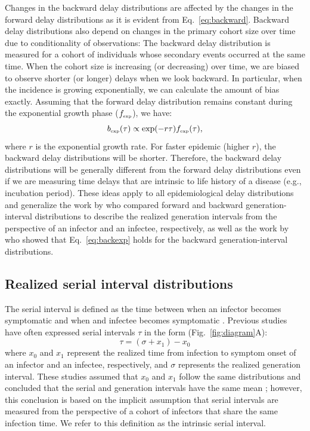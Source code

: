 \documentclass[12pt]{article}
\newcommand{\eref}[1]{Eq.~\ref{eq:#1}}
\newcommand{\fref}[1]{Fig.~\ref{fig:#1}}
\newcommand{\tsub}[2]{#1_{{\textrm{\tiny #2}}}}
\newcommand{\gtime}{\sigma} %
\begin{document}
Changes in the backward delay distributions are affected by the changes in the forward delay distributions as it is evident from \eref{backward}.
Backward delay distributions also depend on changes in the primary cohort size over time due to conditionality of observations: 
The backward delay distribution is measured for a cohort of individuals whose secondary events occurred at the same time.
When the cohort size is increasing (or decreasing) over time, we are biased to observe shorter (or longer) delays when we look backward.
In particular, when the incidence is growing exponentially, we can calculate the amount of bias exactly.
Assuming that the forward delay distribution remains constant during the exponential growth phase ($\tsub{f}{exp}$), we have:
\begin{equation}
\tsub{b}{exp}(\tau) \propto \exp(-r\tau) \tsub{f}{exp}(\tau),
\label{eq:backexp}
\end{equation}
where $r$ is the exponential growth rate.
For faster epidemic (higher $r$), the backward delay distributions will be shorter.
Therefore, the backward delay distributions will be generally different from the forward delay distributions even if we are measuring time delays that are intrinsic to life history of a disease (e.g., incubation period).
These ideas apply to all epidemiological delay distributions and generalize the work by \cite{champredon2015intrinsic} who compared forward and backward generation-interval distributions to describe the realized generation intervals from the perspective of an infector and an infectee, respectively, as well as the work by \cite{britton2019estimation} who showed that \eref{backexp} holds for the backward generation-interval distributions.

\subsection{Realized serial interval distributions}

The serial interval is defined as the time between when an infector becomes symptomatic and when and infectee becomes symptomatic \citep{svensson2007note}.
Previous studies have often expressed serial intervals $\tau$ in the form (\fref{diagram}A):
\begin{equation}
\tau = (\gtime + x_1) - x_0
\end{equation}
where $x_0$ and $x_1$ represent the realized time from infection to symptom onset of an infector and an infectee, respectively, and $\gtime$ represents the realized generation interval.
These studies assumed that $x_0$ and $x_1$ follow the same distributions and concluded that the serial and generation intervals have the same mean \citep{svensson2007note,klinkenberg2011correlation,champredon2018equivalence, britton2019estimation};
however, this conclusion is based on the implicit assumption that serial intervals are measured from the perspective of a cohort of infectors that share the same infection time.
We refer to this definition as the intrinsic serial interval.
\end{document}
